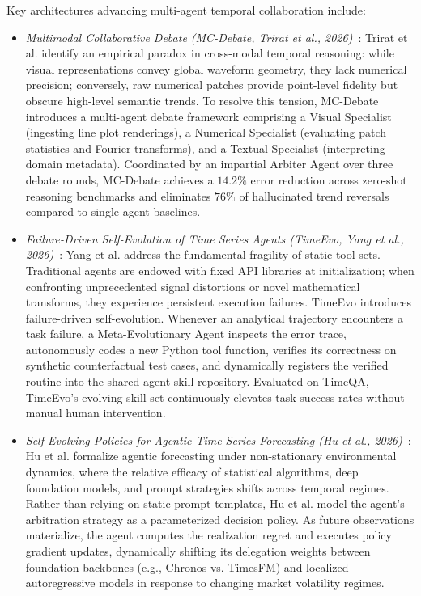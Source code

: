 Key architectures advancing multi-agent temporal collaboration include:
\begin{itemize}[leftmargin=*]
    \item \emph{Multimodal Collaborative Debate (MC-Debate, Trirat et al., 2026)}~\cite{trirat2026multimodal}: Trirat et al. identify an empirical paradox in cross-modal temporal reasoning: while visual representations convey global waveform geometry, they lack numerical precision; conversely, raw numerical patches provide point-level fidelity but obscure high-level semantic trends. To resolve this tension, MC-Debate introduces a multi-agent debate framework comprising a Visual Specialist (ingesting line plot renderings), a Numerical Specialist (evaluating patch statistics and Fourier transforms), and a Textual Specialist (interpreting domain metadata). Coordinated by an impartial Arbiter Agent over three debate rounds, MC-Debate achieves a $14.2\%$ error reduction across zero-shot reasoning benchmarks and eliminates $76\%$ of hallucinated trend reversals compared to single-agent baselines.
    \item \emph{Failure-Driven Self-Evolution of Time Series Agents (TimeEvo, Yang et al., 2026)}~\cite{yang2026timeevo}: Yang et al. address the fundamental fragility of static tool sets. Traditional agents are endowed with fixed API libraries at initialization; when confronting unprecedented signal distortions or novel mathematical transforms, they experience persistent execution failures. TimeEvo introduces failure-driven self-evolution. Whenever an analytical trajectory encounters a task failure, a Meta-Evolutionary Agent inspects the error trace, autonomously codes a new Python tool function, verifies its correctness on synthetic counterfactual test cases, and dynamically registers the verified routine into the shared agent skill repository. Evaluated on TimeQA, TimeEvo's evolving skill set continuously elevates task success rates without manual human intervention.
    \item \emph{Self-Evolving Policies for Agentic Time-Series Forecasting (Hu et al., 2026)}~\cite{hu2026selftraining}: Hu et al. formalize agentic forecasting under non-stationary environmental dynamics, where the relative efficacy of statistical algorithms, deep foundation models, and prompt strategies shifts across temporal regimes. Rather than relying on static prompt templates, Hu et al. model the agent's arbitration strategy as a parameterized decision policy. As future observations materialize, the agent computes the realization regret and executes policy gradient updates, dynamically shifting its delegation weights between foundation backbones (e.g., Chronos vs. TimesFM) and localized autoregressive models in response to changing market volatility regimes.

\end{itemize}
